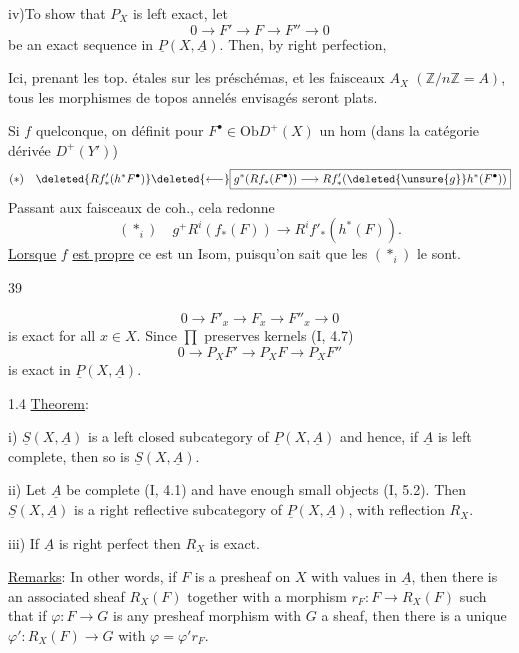 iv)\quad To show that $P_X$ is left exact, let
\[
0\longrightarrow F'\longrightarrow F\longrightarrow F''\longrightarrow0
\]
be an exact sequence in $\underline P(X,\underline A)$.
Then, by right perfection,

Ici, prenant les top. étales sur les préschémas, et les faisceaux
 $A_X$ $(\mathbb Z/n\mathbb Z=A)$,
tous les morphismes de topos annelés envisagés seront plats.


Si $f$ quelconque, on définit pour $F^\bullet\in\mathrm{Ob}D^+(X)$
un hom (dans la catégorie dérivée $D^+(Y')$)
\[
(*)\quad \deleted{Rf'_*(h^*F^\bullet)}
\deleted{\longleftarrow}
\boxed{g^*(Rf_*(F^\bullet))\longrightarrow Rf'_*(\deleted{\unsure{g}}h^*(F^\bullet))}
\]
Passant aux faisceaux de coh., cela redonne
\[
(*_i)\quad g^+R^i(f_*(F))\longrightarrow R^if'_*(h^*(F)).
\]
\uline{Lorsque} $f$ \uline{est propre} ce est un Isom,
puisqu'on sait que les $(*_i)$ le sont.

\begin{flushright}39\end{flushright}
\[
0\longrightarrow F'_x\longrightarrow F_x\longrightarrow F''_x\longrightarrow0
\]
is exact for all $x\in X$. Since $\prod$ preserves kernels (I, 4.7)
\[
0\longrightarrow P_XF'\longrightarrow P_XF\longrightarrow P_XF''
\]
is exact in $\underline P(X,\underline A)$.

1.4 \uline{Theorem}:

i) $\underline S(X,\underline A)$ is a left closed subcategory of $\underline P(X,\underline A)$ and hence, if $\underline A$ is left complete, then so is $\underline S(X,\underline A)$.

ii) Let $\underline A$ be complete (I, 4.1) and have enough small objects (I, 5.2). Then $\underline S(X,\underline A)$ is a right reflective subcategory of $\underline P(X,\underline A)$, with reflection $R_X$.

iii) If $\underline A$ is right perfect then $R_X$ is exact.

\uline{Remarks}: In other words, if $F$ is a presheaf on $X$ with values in $\underline A$, then there is an associated sheaf $R_X(F)$ together with a morphism $r_F:F\longrightarrow R_X(F)$ such that if $\varphi:F\longrightarrow G$ is any presheaf morphism with $G$ a sheaf, then there is a unique $\varphi':R_X(F)\longrightarrow G$ with $\varphi=\varphi'r_F$.

